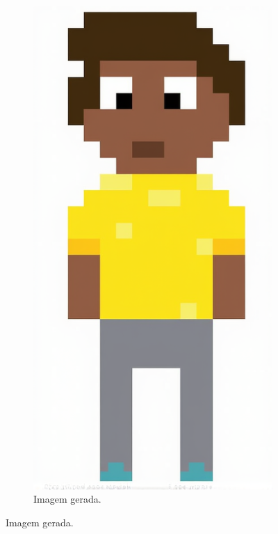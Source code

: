 \begin{figure}[htbp]
\begin{subfigure}{0.15\linewidth}
        \includegraphics[width=1\linewidth]{figs/cgDream/res_img_FluxDev3.png}
        \caption{\small Imagem gerada.}
        \label{fig:cgDream4b}
    \end{subfigure}
\end{figure}


